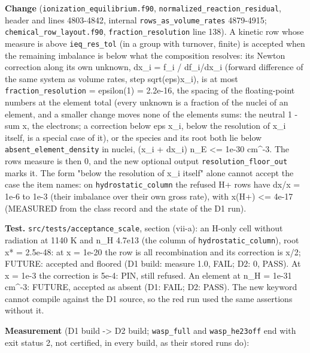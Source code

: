 \documentclass[english,a4paper]{my_memo}
\begin{document}
\textbf{Change} (\texttt{ionization\_equilibrium.f90}, \texttt{normalized\_reaction\_residual},
header and lines 4803-4842, internal \texttt{rows\_as\_volume\_rates} 4879-4915;
\texttt{chemical\_row\_layout.f90}, \texttt{fraction\_resolution} line 138). A kinetic row
whose measure is above \texttt{ieq\_res\_tol} (in a group with turnover, finite) is
accepted when the remaining imbalance is below what the composition
resolves: its Newton correction along its own unknown, dx\_i = \textbar f\_i\textbar{} /
\textbar df\_i/dx\_i\textbar{} (forward difference of the same system as volume rates, step
sqrt(eps)\textbar x\_i\textbar), is at most \texttt{fraction\_resolution} = epsilon(1) = 2.2e-16, the
spacing of the floating-point numbers at the element total (every unknown is
a fraction of the nuclei of an element, and a smaller change moves none of
the element\textquotesingle s sums: the neutral 1 - sum x, the electrons; a correction below
eps \textbar x\_i\textbar, below the resolution of x\_i itself, is a special case of it), or
the species and its root both lie below \texttt{absent\_element\_density} in nuclei,
(\textbar x\_i\textbar{} + dx\_i) n\_E \textless= 1e-30 cm\^{}-3. The row\textquotesingle s measure is then 0, and the new
optional output \texttt{resolution\_floor\_out} marks it. The form "below the
resolution of x\_i itself" alone cannot accept the case the item names: on
\texttt{hydrostatic\_column} the refused H+ rows have dx/x = 1e-6 to 1e-3 (their
imbalance over their own gross rate), with x(H+) \textless= 4e-17 (MEASURED from the
class record and the state of the D1 run).

\textbf{Test.} \texttt{src/tests/acceptance\_scale}, section (vii-a): an H-only cell
without radiation at 1140 K and n\_H 4.7e13 (the column of
\texttt{hydrostatic\_column}), root x* = 2.5e-48: at x = 1e-20 the row is all
recombination and its correction is x/2; FUTURE: accepted and floored (D1
build: measure 1.0, FAIL; D2: 0, PASS). At x = 1e-3 the correction is 5e-4:
PIN, still refused. An element at n\_H = 1e-31 cm\^{}-3: FUTURE, accepted as
absent (D1: FAIL; D2: PASS). The new keyword cannot compile against the D1
source, so the red run used the same assertions without it.

\textbf{Measurement} (D1 build -\textgreater{} D2 build; \texttt{wasp\_full} and \texttt{wasp\_he23off} end
with exit status 2, not certified, in every build, as their stored runs do):
\end{document}
